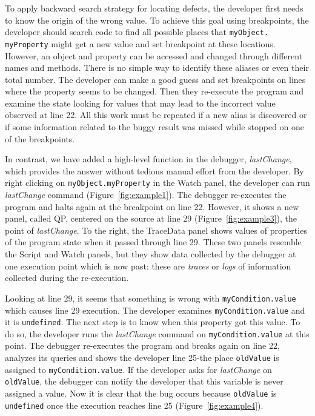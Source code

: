 \documentclass{sig-alternate}
\begin{document}
To apply backward search strategy for locating defects, the developer
first needs to know the origin of the wrong value. To achieve this
goal using breakpoints, the developer should search code to find all possible places that
\texttt{myObject. myProperty} might get a new value and set breakpoint at these locations. However, an
object and property can be accessed and changed through different
names and methods. There is no simple way to identify these aliases or
even their total number.  The developer can make a good guess and set
breakpoints on lines where the property seems to be changed. Then they
re-execute the program and examine the state looking for values that
may lead to the incorrect value observed at line 22. All this work
must be repeated if a new alias is discovered or if some
information related to the buggy result was missed while stopped on
one of the breakpoints.

In contrast, we have added a high-level function in the debugger,
\textit{lastChange}, which provides the answer without tedious manual
effort from the developer. By right clicking on
\texttt{myObject.myProperty} in the Watch panel, the developer can run
\textit{lastChange} command (Figure~\ref{fig:example1}). The debugger
re-executes the program and halts again at the breakpoint on line 22.
However, it shows a new panel, called QP, centered on the source at line 29
(Figure~\ref{fig:example3}), the point of \textit{lastChange}.  To
the right, the TraceData panel shows values of properties of the
program state when it passed through line 29.  These two panels
resemble the Script and Watch panels, but they show data collected by
the debugger at one execution point which is now past: these are
\textit{traces} or \textit{logs} of information collected during the re-execution.

Looking at line 29, it seems that something is wrong with
\texttt{myCondition.value} which causes line 29 execution. The
developer examines \texttt{myCondition.value} and it is
\texttt{undefined}. The next step is to know when this property got
this value. To do so, the developer runs the \textit{lastChange} command
on \texttt{myCondition.value} at this point. The debugger re-executes the
program and breaks again on line 22, analyzes its queries and shows the developer line 25-the
place \texttt{oldValue} is assigned to
\texttt{myCondition.value}. If the developer asks for \textit{lastChange} on \texttt{oldValue}, 
the debugger can notify the developer that this variable is never assigned a value.
 Now it is clear that the bug occurs because \texttt{oldValue} is
\texttt{undefined} once the execution reaches line 25 (Figure~\ref{fig:example4}).
\end{document}
